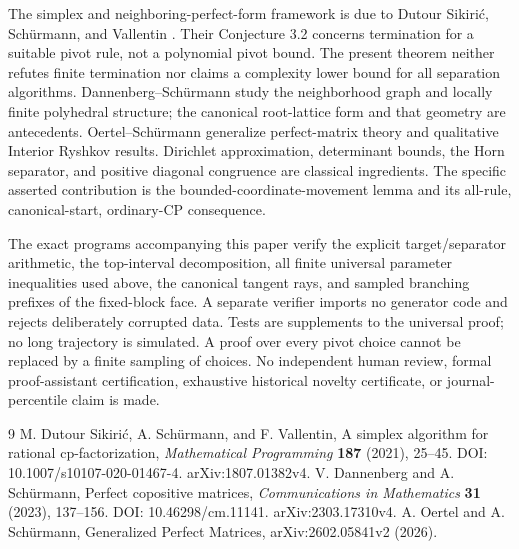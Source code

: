 \documentclass[11pt]{article}
\theoremstyle{remark}\newtheorem{remark}[theorem]{Remark}
\begin{document}
The simplex and neighboring-perfect-form framework is due to Dutour Sikiri\'c, Sch\"urmann, and Vallentin \cite{DSV}. Their Conjecture 3.2 concerns termination for a suitable pivot rule, not a polynomial pivot bound. The present theorem neither refutes finite termination nor claims a complexity lower bound for all separation algorithms. Dannenberg--Sch\"urmann \cite{DS} study the neighborhood graph and locally finite polyhedral structure; the canonical root-lattice form and that geometry are antecedents. Oertel--Sch\"urmann \cite{OS} generalize perfect-matrix theory and qualitative Interior Ryshkov results. Dirichlet approximation, determinant bounds, the Horn separator, and positive diagonal congruence are classical ingredients. The specific asserted contribution is the bounded-coordinate-movement lemma and its all-rule, canonical-start, ordinary-CP consequence.

The exact programs accompanying this paper verify the explicit target/separator arithmetic, the top-interval decomposition, all finite universal parameter inequalities used above, the canonical tangent rays, and sampled branching prefixes of the fixed-block face. A separate verifier imports no generator code and rejects deliberately corrupted data. Tests are supplements to the universal proof; no long trajectory is simulated. A proof over every pivot choice cannot be replaced by a finite sampling of choices. No independent human review, formal proof-assistant certification, exhaustive historical novelty certificate, or journal-percentile claim is made.

\begin{thebibliography}{9}
 M. Dutour Sikiri\'c, A. Sch\"urmann, and F. Vallentin, A simplex algorithm for rational cp-factorization, \emph{Mathematical Programming} \textbf{187} (2021), 25--45. DOI: 10.1007/s10107-020-01467-4. arXiv:1807.01382v4.
 V. Dannenberg and A. Sch\"urmann, Perfect copositive matrices, \emph{Communications in Mathematics} \textbf{31} (2023), 137--156. DOI: 10.46298/cm.11141. arXiv:2303.17310v4.
 A. Oertel and A. Sch\"urmann, Generalized Perfect Matrices, arXiv:2602.05841v2 (2026).
\end{thebibliography}
\end{document}
